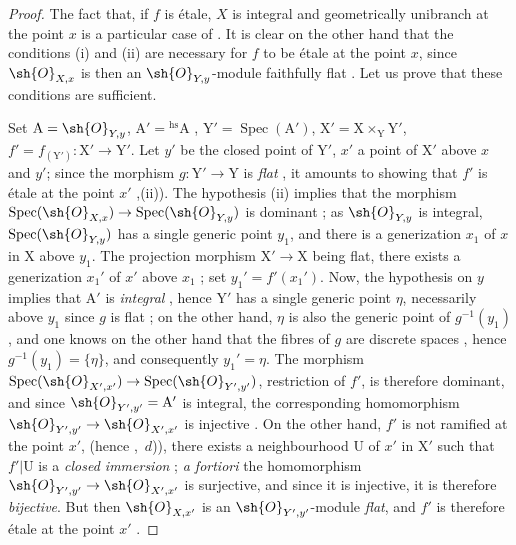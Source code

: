 \begin{proof}
The fact that, if $f$ is \'etale, $X$ is integral and geometrically unibranch at the point $x$ is a particular case of .
It is clear on the other hand that the conditions (i) and (ii) are necessary for $f$ to be \'etale at the point $x$, since $\sh{O}_{X,x}$ is then an $\sh{O}_{Y,y}$-module faithfully flat .
Let us prove that these conditions are sufficient.

Set $\mathrm{A}=\sh{O}_{Y,y}$, $\mathrm{A}'={}^{\mathrm{hs}}\mathrm{A}$ , $\mathrm{Y}'=\operatorname{Spec}(\mathrm{A}')$, $\mathrm{X}'=\mathrm{X}\times_{\mathrm{Y}}\mathrm{Y}'$, $f'=f_{(\mathrm{Y}')}:\mathrm{X}'\to\mathrm{Y}'$.
Let $y'$ be the closed point of $\mathrm{Y}'$, $x'$ a point of $\mathrm{X}'$ above $x$ and $y'$; since the morphism $g:\mathrm{Y}'\to\mathrm{Y}$ is \emph{flat} , it amounts to showing that $f'$ is \'etale at the point $x'$ ,(ii)).
The hypothesis (ii) implies that the morphism $\operatorname{Spec}(\sh{O}_{X,x})\to\operatorname{Spec}(\sh{O}_{Y,y})$ is dominant ; as $\sh{O}_{Y,y}$ is integral, $\operatorname{Spec}(\sh{O}_{Y,y})$ has a single generic point $y_1$, and there is a generization $x_1$ of $x$ in $\mathrm{X}$ above $y_1$.
The projection morphism $\mathrm{X}'\to\mathrm{X}$ being flat, there exists a generization $x_1'$ of $x'$ above $x_1$ ; set $y_1'=f'(x_1')$.
Now, the hypothesis on $y$ implies that $\mathrm{A}'$ is \emph{integral} , hence $\mathrm{Y}'$ has a single generic point $\eta$, necessarily above $y_1$ since $g$
is flat ; on the other hand, $\eta$ is also the generic point of $g^{-1}(y_1)$ , and one knows on the other hand that the fibres of $g$ are discrete spaces , hence $g^{-1}(y_1)=\{\eta\}$, and consequently $y_1'=\eta$.
The morphism $\operatorname{Spec}(\sh{O}_{X',x'})\to\operatorname{Spec}(\sh{O}_{Y',y'})$, restriction of $f'$, is therefore dominant, and since $\sh{O}_{Y',y'}=\mathrm{A}'$ is integral, the corresponding homomorphism $\sh{O}_{Y',y'}\to\sh{O}_{X',x'}$ is injective .
On the other hand, $f'$ is not ramified at the point $x'$, (hence ,~$d$)), there exists a neighbourhood $\mathrm{U}$ of $x'$ in $\mathrm{X}'$ such that $f'|\mathrm{U}$ is a \emph{closed immersion} ; \emph{a fortiori} the homomorphism $\sh{O}_{Y',y'}\to\sh{O}_{X',x'}$ is surjective, and since it is injective, it is therefore \emph{bijective}.
But then $\sh{O}_{X,x'}$ is an $\sh{O}_{Y',y'}$-module \emph{flat}, and $f'$ is therefore \'etale at the point $x'$ .


\end{proof}
